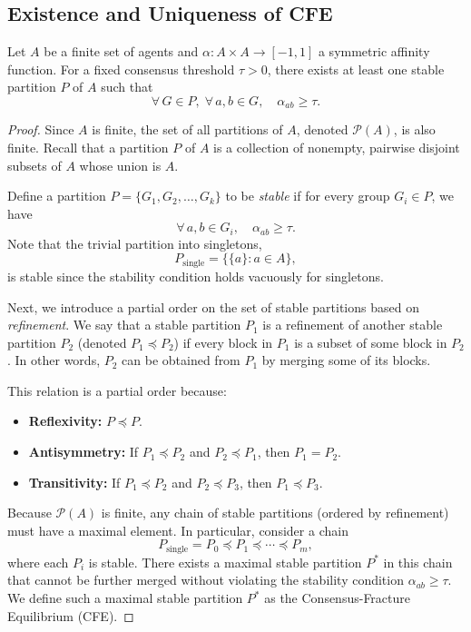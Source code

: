 \documentclass{article}
\begin{document}
\subsection{Existence and Uniqueness of CFE}

\begin{theorem}
Let $A$ be a finite set of agents and $\alpha : A \times A \to [-1,1]$ a symmetric affinity function. For a fixed consensus threshold $\tau > 0$, there exists at least one stable partition $P$ of $A$ such that
\[
\forall\,G \in P,\; \forall\,a,b \in G,\quad \alpha_{ab}\ge \tau.
\]
\end{theorem}

\begin{proof}
Since $A$ is finite, the set of all partitions of $A$, denoted $\mathcal{P}(A)$, is also finite. Recall that a partition $P$ of $A$ is a collection of nonempty, pairwise disjoint subsets of $A$ whose union is $A$.

Define a partition $P = \{G_1, G_2, \dots, G_k\}$ to be \emph{stable} if for every group $G_i \in P$, we have
\[
\forall\,a,b \in G_i,\quad \alpha_{ab}\ge \tau.
\]
Note that the trivial partition into singletons,
\[
P_{\text{single}} = \{\{a\} : a \in A\},
\]
is stable since the stability condition holds vacuously for singletons.

Next, we introduce a partial order on the set of stable partitions based on \emph{refinement}. We say that a stable partition $P_1$ is a refinement of another stable partition $P_2$ (denoted $P_1 \preceq P_2$) if every block in $P_1$ is a subset of some block in $P_2$. In other words, $P_2$ can be obtained from $P_1$ by merging some of its blocks.

This relation is a partial order because:
\begin{itemize}
    \item \textbf{Reflexivity:} $P \preceq P$.
    \item \textbf{Antisymmetry:} If $P_1 \preceq P_2$ and $P_2 \preceq P_1$, then $P_1 = P_2$.
    \item \textbf{Transitivity:} If $P_1 \preceq P_2$ and $P_2 \preceq P_3$, then $P_1 \preceq P_3$.
\end{itemize}

Because $\mathcal{P}(A)$ is finite, any chain of stable partitions (ordered by refinement) must have a maximal element. In particular, consider a chain
\[
P_{\text{single}} = P_0 \preceq P_1 \preceq \cdots \preceq P_m,
\]
where each $P_i$ is stable. There exists a maximal stable partition $P^*$ in this chain that cannot be further merged without violating the stability condition $\alpha_{ab}\ge \tau$. We define such a maximal stable partition $P^*$ as the Consensus-Fracture Equilibrium (CFE).

\end{proof}
\end{document}
